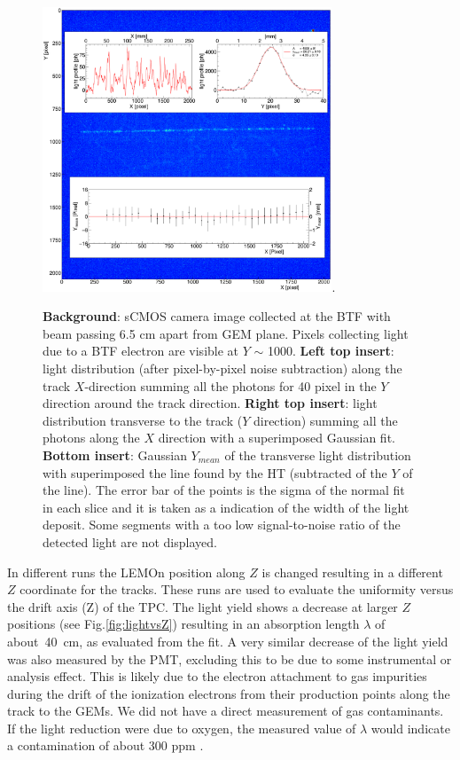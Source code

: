 \documentclass[review]{elsarticle}
\begin{document}
  
\begin{figure}[!ht]
\centering
\includegraphics[width=3.4in]{Fig4-Track-Z.pdf}\DeclareGraphicsExtensions.
\caption{{\bf Background}: sCMOS camera  image collected at the BTF with beam passing 6.5 cm apart from GEM plane. Pixels collecting light due to a BTF electron are visible at $Y$ $\sim$ 1000. {\bf Left top insert}:  light distribution (after pixel-by-pixel noise subtraction) along the track $X$-direction summing all the photons for 40 pixel in the  $Y$ direction around the track direction. {\bf Right top insert}: light distribution  transverse to the track ($Y$ direction) summing all the photons along the  $X$ direction  with a superimposed Gaussian fit. {\bf Bottom insert}: Gaussian $Y_{mean}$ of the transverse light distribution 
with superimposed the line found by the HT (subtracted of the $Y$ of the line). 
The error bar of the points is the sigma of the normal fit in each slice and it is taken as a indication of the width of the light deposit. Some segments with a  too low signal-to-noise ratio of the detected light are not displayed. }
\label{fig:tracking}
\end{figure}

In different runs the LEMOn position along $Z$ is changed resulting in a different $Z$ coordinate for the tracks. These runs  are used to evaluate the uniformity versus the drift axis  (Z) of the TPC. The light yield shows a decrease at larger $Z$ positions (see Fig.\ref{fig:lightvsZ}) resulting in
an absorption length $\lambda$ of about~40~cm, as evaluated from the fit. 
 A very similar decrease of the light yield was also measured by the PMT, excluding this to be due to some instrumental or analysis effect.
 This is likely due to the electron attachment to gas impurities during the drift of the ionization electrons from their production points along the track to the GEMs. We did not have a direct measurement of gas contaminants. If the light reduction were due to oxygen, the measured value of $\lambda$ would indicate a contamination of about 300 ppm \cite{bib:2001mug}.
\end{document}
